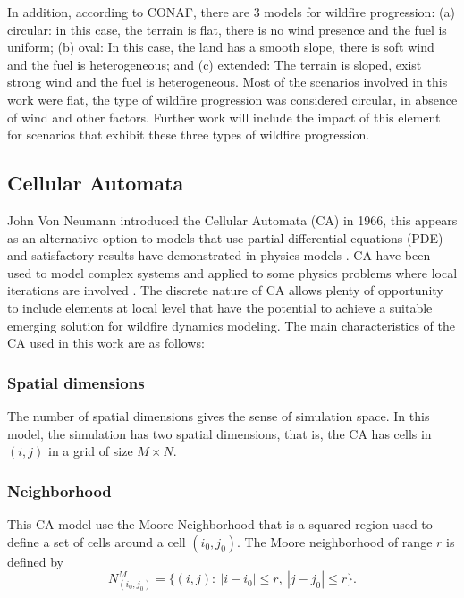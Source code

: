 \documentclass[conference]{IEEEtran}
\begin{document}
      In addition, according to CONAF, there are 3 models for wildfire progression: (a)
      circular: in this case, the terrain is flat, there is no wind presence and the fuel is
      uniform; (b) oval: In this case, the land has a smooth slope, there is soft wind and the
      fuel is heterogeneous; and (c) extended: The terrain is sloped, exist strong wind and
      the fuel is heterogeneous. Most of the scenarios involved in this work were flat, the
      type of wildfire progression was considered circular, in absence of wind and other
      factors. Further work will include the impact of this element for scenarios that exhibit
      these three types of wildfire progression.
    

    \subsection{Cellular Automata}
    
      John Von Neumann introduced the Cellular Automata (CA) in 1966, this appears as an alternative option to 
      models that use partial differential equations (PDE) and satisfactory results have demonstrated in physics 
      models \cite{toffoli1984cellular}. CA have been used to model complex systems \cite{wolfram1994cellular} 
      and applied to some physics problems where local iterations are involved \cite{chopard1991cellular, 
      gerhardt1989cellular}. The discrete nature of CA allows plenty of opportunity to include elements at local 
      level that have the potential to achieve a suitable emerging solution for wildfire dynamics modeling. 
      The main characteristics of the CA used in this work are as follows:
      
      \subsubsection{Spatial dimensions}
      
        The number of spatial dimensions gives the sense of simulation space. In this model, the simulation has 
        two spatial dimensions, that is, the CA has cells in $(i,j)$ in a grid of size $M\times N$.

          
      \subsubsection{Neighborhood}
      
        This CA model use the Moore Neighborhood \cite{moorewolfram} that is a squared region used 
        to define a set of cells around a cell $(i_0,j_0)$. The Moore neighborhood of range $r$ is defined by
        \begin{equation}
            N_{(i_0,j_0)}^M = \{(i,j): ~ |i-i_0|\leq r, ~ |j-j_0|\leq r \}.
        \end{equation}
        
\end{document}
